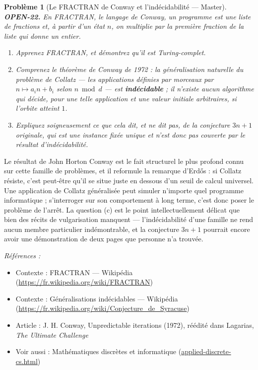 \documentclass[11pt]{article}
\newtheorem{problem}{Problème}
\newenvironment{refs}{\par\small\noindent\emph{Références :}\begin{itemize}\setlength\itemsep{0pt}}{\end{itemize}\normalsize}
\begin{document}
\bigskip

\begin{problem}[{Le FRACTRAN de Conway et l'indécidabilité --- Master}]
\textbf{OPEN-22.} En FRACTRAN, le langage de Conway, un programme est une liste de
fractions et, à partir d'un état $ n $, on multiplie par la première fraction de la
liste qui donne un entier.
\begin{enumerate}
\item[(a)] Apprenez FRACTRAN, et démontrez qu'il est Turing-complet.
\item[(b)] Comprenez le théorème de Conway de 1972 : la généralisation naturelle du problème de
Collatz --- les applications définies par morceaux par $ n \mapsto a_i n + b_i $ selon
$ n \bmod d $ --- est \textbf{indécidable} ; il n'existe aucun algorithme qui décide, pour
une telle application et une valeur initiale arbitraires, si l'orbite atteint $ 1 $.
\item[(c)] Expliquez soigneusement ce que cela dit, et ne dit pas, de la conjecture $ 3n+1 $
originale, qui est une instance fixée unique et n'est donc pas couverte par le résultat
d'indécidabilité.
\end{enumerate}

\end{problem}

\noindent Le résultat de John Horton Conway est le fait structurel le plus profond
connu sur cette famille de problèmes, et il reformule la remarque d'Erd\H{o}s : si Collatz
résiste, c'est peut-être qu'il se situe juste en dessous d'un seuil de calcul universel.
Une application de Collatz généralisée peut simuler n'importe quel programme
informatique ; s'interroger sur son comportement à long terme, c'est donc poser le
problème de l'arrêt. La question (c) est le point intellectuellement délicat que bien des
récits de vulgarisation manquent --- l'indécidabilité d'une famille ne rend aucun membre
particulier indémontrable, et la conjecture $ 3n+1 $ pourrait encore avoir une
démonstration de deux pages que personne n'a trouvée.

\begin{refs}
\item Contexte : FRACTRAN --- Wikipédia (\url{https://fr.wikipedia.org/wiki/FRACTRAN})
\item Contexte : Généralisations indécidables --- Wikipédia (\url{https://fr.wikipedia.org/wiki/Conjecture_de_Syracuse})
\item Article : J. H. Conway, \og{} Unpredictable iterations \fg{} (1972), réédité dans Lagarias, \textit{The Ultimate Challenge}
\item Voir aussi : Mathématiques discrètes et informatique (\url{applied-discrete-cs.html})
\end{refs}
\end{document}
